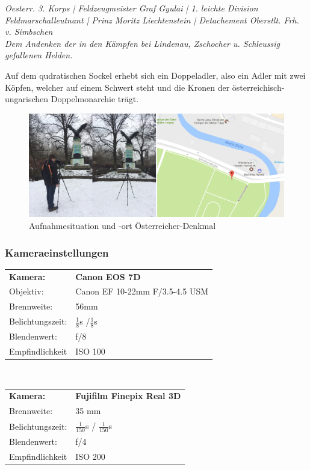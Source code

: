 \documentclass[liststotoc,bibtotoc,fontsize=14pt,]{scrreprt}
\begin{document}
\bigskip
\begin{center} 
	\textit{Oesterr. 3. Korps | Feldzeugmeister Graf Gyulai | 1. leichte Division Feldmarschalleutnant | Prinz Moritz Liechtenstein | Detachement Oberstlt. Frh. v. Simbschen\\
		Dem Andenken der in den Kämpfen bei Lindenau, Zschocher u. Schleussig gefallenen Helden.} 
\end{center}

\bigskip
Auf dem qudratischen Sockel erhebt sich ein Doppeladler, also ein Adler mit zwei Köpfen, welcher auf einem Schwert steht und die Kronen der österreichisch-ungarischen Doppelmonarchie trägt. 

		\begin{figure}[H]
			\includegraphics[width=\linewidth]{img/places/oer.jpg}
			\caption{Aufnahmesituation und -ort Österreicher-Denkmal}
			\label{img:oer}
		\end{figure}
		
		\subsubsection{Kameraeinstellungen}
		\begin{tabular}{ll}
			\textbf{Kamera:} &\textbf{Canon EOS 7D} \\
			Objektiv: &Canon EF 10-22mm F/3.5-4.5 USM\\		
			Brennweite:& 56mm \\
			Belichtungszeit: & $\frac{1}{8}$s /$\frac{1}{8}$s\\
			Blendenwert: & f/8\\
			Empfindlichkeit & ISO 100 \\
		\end{tabular}\\
		
		\begin{tabular}{ll}
			\textbf{Kamera:} &\textbf{Fujifilm Finepix Real 3D} \\
			Brennweite:& 35 mm \\
			Belichtungszeit: & $\frac{1}{150}$s / $\frac{1}{150}$s\\
			Blendenwert: & f/4\\
			Empfindlichkeit & ISO 200 \\
		\end{tabular}\\
\end{document}
